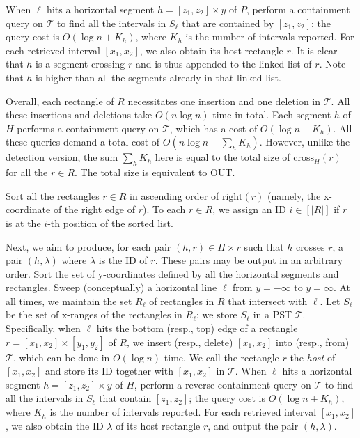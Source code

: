 \documentclass[acmsmall,review,anonymous]{acmart}
\def\vgap{\vspace{1mm}}
\def\extraspacing{\vspace{2mm} \noindent}
\def\T{\mathcal{T}}
\def\xright{\mathrm{right}}
\def\cross{\mathrm{cross}}
\def\out{\mathrm{OUT}}
\begin{document}
{{{\vgap

When $\ell$ hits a horizontal segment $h = [z_1, z_2] \times y$ of $P$, perform a containment query on $\T$ to find all the intervals in $S_\ell$ that are contained by $[z_1, z_2]$; the query cost is $O(\log n + K_h)$, where $K_h$ is the number of intervals reported. For each retrieved interval $[x_1, x_2]$, we also obtain its host rectangle $r$. It is clear that $h$ is a segment crossing $r$ and is thus appended to the linked list of $r$. Note that $h$ is higher than all the segments already in that linked list.

\vgap

Overall, each rectangle of $R$ necessitates one insertion and one deletion in $\T$. All these insertions and deletions take $O(n \log n)$ time in total. Each segment $h$ of $H$ performs a containment query on $\T$, which has a cost of $O(\log n + K_h)$. All these queries demand a total cost of $O(n \log n + \sum_h K_h)$. However, unlike the detection version, the sum $\sum_h K_h$ here is equal to the total size of $\cross_H(r)$ for all the $r \in R$. The total size is equivalent to $\out$.


\extraspacing {\bf Algorithm for Problem $\bm{\mathscr{E}}$.} Sort all the rectangles $r \in R$ in ascending order of $\xright(r)$ (namely, the x-coordinate of the right edge of $r$). To each $r \in R$, we assign an ID $i \in [|R|]$ if $r$ is at the $i$-th position of the sorted list.


\vgap

Next, we aim to produce, for each pair $(h, r) \in H \times r$ such that $h$ crosses $r$, a pair $(h, \lambda)$ where $\lambda$ is the ID of $r$. These pairs may be output in an arbitrary order. Sort the set of y-coordinates defined by all the horizontal segments and rectangles. Sweep (conceptually) a horizontal line $\ell$ from $y = -\infty$ to $y = \infty$. At all times, we maintain the set $R_\ell$ of rectangles in $R$ that intersect with $\ell$. Let $S_\ell$ be the set of x-ranges of the rectangles in $R_\ell$; we store $S_\ell$ in a PST $\T$. Specifically, when $\ell$ hits the bottom (resp., top) edge of a rectangle $r = [x_1, x_2] \times [y_1, y_2]$ of $R$, we insert (resp., delete) $[x_1, x_2]$ into (resp., from) $\T$, which can be done in $O(\log n)$ time. We call the rectangle $r$ the {\em host} of $[x_1, x_2]$ and store its ID together with $[x_1, x_2]$ in $\T$. When $\ell$ hits a horizontal segment $h = [z_1, z_2] \times y$ of $H$, perform a reverse-containment query on $\T$ to find all the intervals in $S_\ell$ that contain $[z_1, z_2]$; the query cost is $O(\log n + K_h)$, where $K_h$ is the number of intervals reported. For each retrieved interval $[x_1, x_2]$, we also obtain the ID $\lambda$ of its host rectangle $r$, and output the pair $(h, \lambda)$.

}}}
\end{document}

